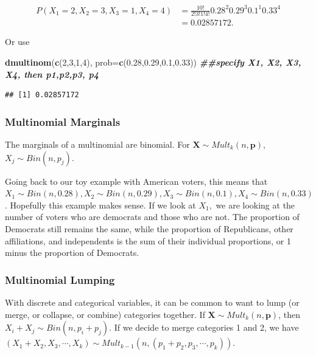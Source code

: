 \documentclass[
]{book}
\newenvironment{Shaded}{\begin{snugshade}}{\end{snugshade}}
\newcommand{\AttributeTok}[1]{\textcolor[rgb]{0.13,0.29,0.53}{#1}}
\newcommand{\DecValTok}[1]{\textcolor[rgb]{0.00,0.00,0.81}{#1}}
\newcommand{\DocumentationTok}[1]{\textcolor[rgb]{0.56,0.35,0.01}{\textbf{\textit{#1}}}}
\newcommand{\FloatTok}[1]{\textcolor[rgb]{0.00,0.00,0.81}{#1}}
\newcommand{\FunctionTok}[1]{\textcolor[rgb]{0.13,0.29,0.53}{\textbf{#1}}}
\newcommand{\NormalTok}[1]{#1}
\begin{document}
\[
\begin{split}
P(X_1 = 2, X_2 = 3, X_3 = 1, X_4 = 4) &= \frac{10!}{2! 3! 1!4!} 0.28^{2} 0.29^{3} 0.1^1 0.33^4\\
 &= 0.02857172.
\end{split}
\]

Or use

\begin{Shaded}
\begin{Highlighting}[]
\FunctionTok{dmultinom}\NormalTok{(}\FunctionTok{c}\NormalTok{(}\DecValTok{2}\NormalTok{,}\DecValTok{3}\NormalTok{,}\DecValTok{1}\NormalTok{,}\DecValTok{4}\NormalTok{), }\AttributeTok{prob=}\FunctionTok{c}\NormalTok{(}\FloatTok{0.28}\NormalTok{,}\FloatTok{0.29}\NormalTok{,}\FloatTok{0.1}\NormalTok{,}\FloatTok{0.33}\NormalTok{)) }\DocumentationTok{\#\#specify X1, X2, X3, X4, then p1,p2,p3, p4}
\end{Highlighting}
\end{Shaded}

\begin{verbatim}
## [1] 0.02857172
\end{verbatim}

\hypertarget{multinomial-marginals}{%
\subsubsection{Multinomial Marginals}\label{multinomial-marginals}}

The marginals of a multinomial are binomial. For \(\boldsymbol{X} \sim Mult_k(n, \boldsymbol{p})\), \(X_j \sim Bin(n, p_j)\).

Going back to our toy example with American voters, this means that \(X_1 \sim Bin(n,0.28), X_2 \sim Bin(n,0.29), X_3 \sim Bin(n, 0.1), X_4 \sim Bin(n,0.33)\). Hopefully this example makes sense. If we look at \(X_1,\) we are looking at the number of voters who are democrats and those who are not. The proportion of Democrats still remains the same, while the proportion of Republicans, other affiliations, and independents is the sum of their individual proportions, or 1 minus the proportion of Democrats.

\hypertarget{multinomial-lumping}{%
\subsubsection{Multinomial Lumping}\label{multinomial-lumping}}

With discrete and categorical variables, it can be common to want to lump (or merge, or collapse, or combine) categories together. If \(\boldsymbol{X} \sim Mult_k(n, \boldsymbol{p})\), then \(X_i + X_j \sim Bin(n, p_i + p_j)\). If we decide to merge categories 1 and 2, we have \((X_1 + X_2, X_3, \cdots, X_k) \sim Mult_{k-1}(n, (p_1 + p_2, p_3, \cdots, p_k))\).
\end{document}
